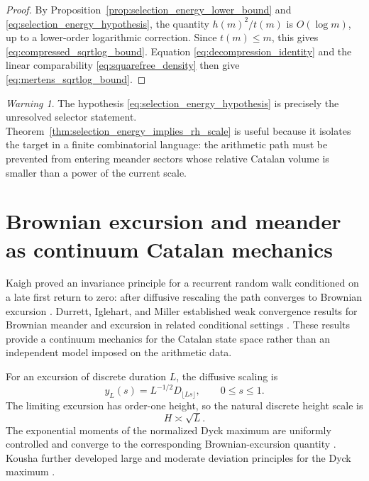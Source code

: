 \documentclass[11pt]{amsart}
\numberwithin{equation}{section}
\theoremstyle{plain}
\theoremstyle{definition}
\theoremstyle{remark}
\newtheorem{warning}[theorem]{Warning}
\begin{document}
\begin{proof}
By Proposition~\ref{prop:selection_energy_lower_bound} and \eqref{eq:selection_energy_hypothesis}, the quantity $h(m)^2/t(m)$ is $O(\log m)$, up to a lower-order logarithmic correction.  Since $t(m)\le m$, this gives \eqref{eq:compressed_sqrtlog_bound}.  Equation \eqref{eq:decompression_identity} and the linear comparability \eqref{eq:squarefree_density} then give \eqref{eq:mertens_sqrtlog_bound}.
\end{proof}

\begin{warning}
\label{warn:selection_energy_is_the_wall}
The hypothesis \eqref{eq:selection_energy_hypothesis} is precisely the unresolved selector statement.  Theorem~\ref{thm:selection_energy_implies_rh_scale} is useful because it isolates the target in a finite combinatorial language: the arithmetic path must be prevented from entering meander sectors whose relative Catalan volume is smaller than a power of the current scale.
\end{warning}

\section{Brownian excursion and meander as continuum Catalan mechanics}
\label{sec:brownian_mechanics}

Kaigh proved an invariance principle for a recurrent random walk conditioned on a late first return to zero: after diffusive rescaling the path converges to Brownian excursion \cite{Kaigh1976}.  Durrett, Iglehart, and Miller established weak convergence results for Brownian meander and excursion in related conditional settings \cite{DurrettIglehartMiller1977}.  These results provide a continuum mechanics for the Catalan state space rather than an independent model imposed on the arithmetic data.

For an excursion of discrete duration $L$, the diffusive scaling is
\begin{equation}
y_L(s)=L^{-1/2}D_{\lfloor Ls\rfloor},
\qquad 0\le s\le1.
\label{eq:diffusive_excursion_scaling}
\end{equation}
The limiting excursion has order-one height, so the natural discrete height scale is
\begin{equation}
H\asymp \sqrt L.
\label{eq:brownian_height_scale}
\end{equation}
The exponential moments of the normalized Dyck maximum are uniformly controlled and converge to the corresponding Brownian-excursion quantity \cite{KhorunzhiyMarckert2009}.  Kousha further developed large and moderate deviation principles for the Dyck maximum \cite{Kousha2012}.
\end{document}
